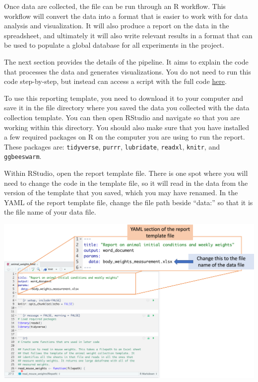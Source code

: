 \documentclass[
]{book}
\begin{document}
Once data are collected, the file can be run through an R workflow. This workflow
will convert the data into a format that is easier to work with for data analysis
and visualization. It will also produce a report on the data in the spreadsheet, and
ultimately it will also write relevant results in a format that can be used
to populate a global database for all experiments in the project.

The next section provides the details of the pipeline. It aims to explain the
code that processes the data and generates visualizations. You do not need to
run this code step-by-step, but instead can access a script with the full
code \href{https://raw.githubusercontent.com/csu-impactb/CODING-TEAM-BOOKDOWN-/main/templates/report_templates/animal_weights.Rmd}{here}.

To use this reporting template, you need to download it to your computer and
save it in the file directory where you saved the data you collected with the
data collection template. You can then open RStudio and navigate so that you are
working within this directory. You should also make sure that you have installed
a few required packages on R on the computer you are using to run the report.
These packages are: \texttt{tidyverse}, \texttt{purrr}, \texttt{lubridate}, \texttt{readxl}, \texttt{knitr}, and
\texttt{ggbeeswarm}.

Within RStudio, open the report template file. There is one spot where you will
need to change the code in the template file, so it will read in the data from
the version of the template that you saved, which you may have renamed.
In the YAML of the report template file, change the file path beside ``data:''
so that it is the file name of your data file.

\includegraphics[width=1\linewidth]{figures/changing_file_path_weights_report_template}
\end{document}

